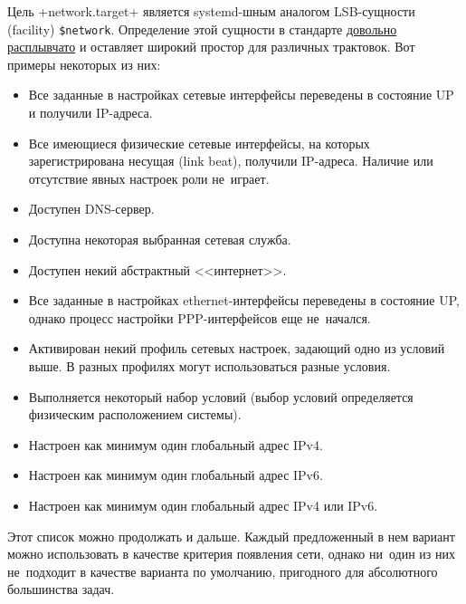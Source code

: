 \documentclass[10pt,oneside,a4paper]{article}
\begin{document}
Цель +network.target+ является systemd-шным аналогом LSB-сущности (facility)
\verb+$network+. Определение этой сущности в стандарте
\href{http://refspecs.linuxbase.org/LSB_3.1.1/LSB-Core-generic/LSB-Core-generic/facilname.html}%
{довольно расплывчато} и оставляет широкий простор для различных трактовок. Вот
примеры некоторых из них:
\begin{itemize}
	\item Все заданные в настройках сетевые интерфейсы переведены в состояние
		UP и получили IP-адреса.
	\item Все имеющиеся физические сетевые интерфейсы, на которых
		зарегистрирована несущая (link beat), получили IP-адреса.
		Наличие или отсутствие явных настроек роли не~играет.
	\item Доступен DNS-сервер.
	\item Доступна некоторая выбранная сетевая служба.
	\item Доступен некий абстрактный <<интернет>>.
	\item Все заданные в настройках ethernet-интерфейсы переведены в
		состояние UP, однако процесс настройки PPP-интерфейсов еще
		не~начался.
	\item Активирован некий профиль сетевых настроек, задающий одно из
		условий выше. В разных профилях могут использоваться разные
		условия.
	\item Выполняется некоторый набор условий (выбор условий определяется
		физическим расположением системы).
	\item Настроен как минимум один глобальный адрес IPv4.
	\item Настроен как минимум один глобальный адрес IPv6.
	\item Настроен как минимум один глобальный адрес IPv4 или IPv6.
\end{itemize}

Этот список можно продолжать и дальше. Каждый предложенный в нем вариант можно
использовать в качестве критерия появления сети, однако ни~один из них
не~подходит в качестве варианта по умолчанию, пригодного для абсолютного
большинства задач.
\end{document}
